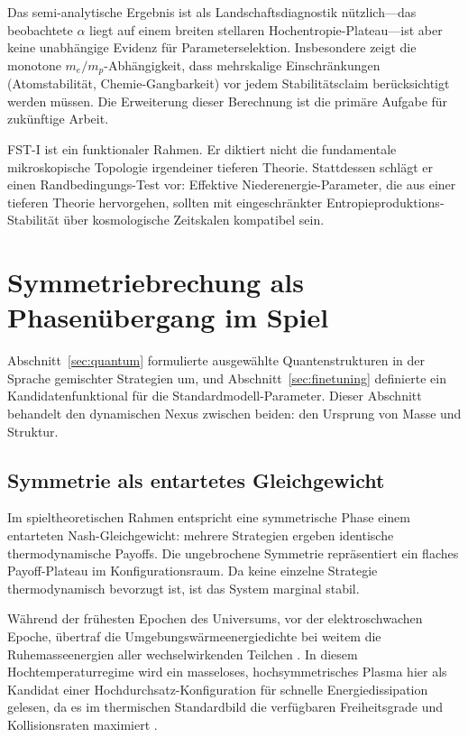 \documentclass[12pt,a4paper]{article}
\theoremstyle{remark}
\begin{document}
Das semi-analytische Ergebnis ist als Landschaftsdiagnostik n\"utzlich---das beobachtete $\alpha$ liegt auf einem breiten stellaren Hochentropie-Plateau---ist aber keine unabh\"angige Evidenz f\"ur Parameterselektion. Insbesondere zeigt die monotone $m_e/m_p$-Abh\"angigkeit, dass mehrskalige Einschr\"ankungen (Atomstabilit\"at, Chemie-Gangbarkeit) vor jedem Stabilit\"atsclaim ber\"ucksichtigt werden m\"ussen. Die Erweiterung dieser Berechnung ist die prim\"are Aufgabe f\"ur zuk\"unftige Arbeit.

FST-I ist ein funktionaler Rahmen. Er diktiert nicht die fundamentale mikroskopische Topologie irgendeiner tieferen Theorie. Stattdessen schl\"agt er einen Randbedingungs-Test vor: Effektive Niederenergie-Parameter, die aus einer tieferen Theorie hervorgehen, sollten mit eingeschr\"ankter Entropieproduktions-Stabilit\"at \"uber kosmologische Zeitskalen kompatibel sein.

\section{Symmetriebrechung als Phasen\"ubergang im Spiel}
\label{sec:symmetry}

Abschnitt~\ref{sec:quantum} formulierte ausgew\"ahlte Quantenstrukturen in der Sprache gemischter Strategien um, und Abschnitt~\ref{sec:finetuning} definierte ein Kandidatenfunktional f\"ur die Standardmodell-Parameter. Dieser Abschnitt behandelt den dynamischen Nexus zwischen beiden: den Ursprung von Masse und Struktur.

\subsection{Symmetrie als entartetes Gleichgewicht}

Im spieltheoretischen Rahmen entspricht eine symmetrische Phase einem entarteten Nash-Gleichgewicht: mehrere Strategien ergeben identische thermodynamische Payoffs. Die ungebrochene Symmetrie repr\"asentiert ein flaches Payoff-Plateau im Konfigurationsraum. Da keine einzelne Strategie thermodynamisch bevorzugt ist, ist das System marginal stabil.

W\"ahrend der fr\"uhesten Epochen des Universums, vor der elektroschwachen Epoche, \"ubertraf die Umgebungsw\"armeenergiedichte bei weitem die Ruhemasseenergien aller wechselwirkenden Teilchen \citep{HiggsVEV}. In diesem Hochtemperaturregime wird ein masseloses, hochsymmetrisches Plasma hier als Kandidat einer Hochdurchsatz-Konfiguration f\"ur schnelle Energiedissipation gelesen, da es im thermischen Standardbild die verf\"ugbaren Freiheitsgrade und Kollisionsraten maximiert \citep{HiggsVEV2024}.
\end{document}
